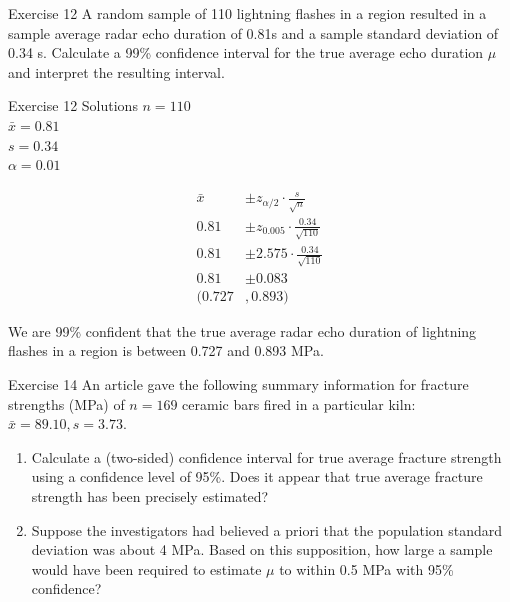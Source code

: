 \documentclass[
  ignorenonframetext,
]{beamer}
\providecommand{\tightlist}{%
  \setlength{\itemsep}{0pt}\setlength{\parskip}{0pt}}\usepackage{longtable,booktabs,array}
\begin{document}
\begin{frame}{Exercise 12}
\protect\hypertarget{exercise-12}{}
A random sample of 110 lightning flashes in a region resulted in a
sample average radar echo duration of 0.81s and a sample standard
deviation of 0.34 s. Calculate a 99\% confidence interval for the true
average echo duration \(\mu\) and interpret the resulting interval.
\end{frame}

\begin{frame}{Exercise 12 Solutions}
\protect\hypertarget{exercise-12-solutions}{}
\(n = 110\)\\
\(\bar{x} = 0.81\)\\
\(s = 0.34\)\\
\(\alpha = 0.01\)

\[ 
\begin{aligned}
\bar{x} &\pm z_{\alpha/2}\cdot \frac{s}{\sqrt{n}} \\
0.81 &\pm z_{0.005}\cdot \frac{0.34}{\sqrt{110}} \\
0.81 &\pm 2.575 \cdot \frac{0.34}{\sqrt{110}} \\
0.81 &\pm 0.083 \\
(0.727&, 0.893)
\end{aligned}
\]

We are 99\% confident that the true average radar echo duration of
lightning flashes in a region is between 0.727 and 0.893 MPa.
\end{frame}

\begin{frame}{Exercise 14}
\protect\hypertarget{exercise-14}{}
An article gave the following summary information for fracture strengths
(MPa) of \(n = 169\) ceramic bars fired in a particular kiln:
\(\bar{x} = 89.10, s = 3.73\).

\begin{enumerate}[<+->]
[a.]
\tightlist
\item
  Calculate a (two-sided) confidence interval for true average fracture
  strength using a confidence level of 95\%. Does it appear that true
  average fracture strength has been precisely estimated?
\item
  Suppose the investigators had believed a priori that the population
  standard deviation was about 4 MPa. Based on this supposition, how
  large a sample would have been required to estimate \(\mu\) to within
  0.5 MPa with 95\% confidence?
\end{enumerate}
\end{frame}
\end{document}
